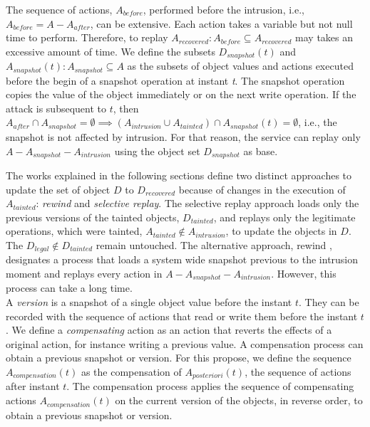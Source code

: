The sequence of actions, $A_{before}$, performed before the intrusion, i.e., $A_{before} = A - A_{after}$, can be extensive. Each action takes a variable but not null time to perform. Therefore, to replay $A_{recovered} : A_{before} \subseteq A_{recovered} $ may takes an excessive amount of time. We define the subsets $D_{snapshot}(t)$ and $A_{snapshot}(t) : A_{snapshot} \subseteq A$ as the subsets of object values and actions executed before the begin of a snapshot operation at instant \textit{t}. The snapshot operation copies the value of the object immediately or on the next write operation. If the attack is subsequent to $t$, then $A_{after} \cap A_{snapshot} = \emptyset \implies (A_{intrusion} \cup A_{tainted}) \cap A_{snapshot}(t) = \emptyset$, i.e., the snapshot is not affected by intrusion. For that reason, the service can replay only $A-A_{snapshot}-A_{intrusion}$ using the object set $D_{snapshot}$ as base. 


The works explained in the following sections define two distinct approaches to update the set of object $D$ to $D_{recovered}$ because of changes in the execution of $A_{tainted}$: \textit{rewind} and \textit{selective replay}. The selective replay approach loads only the previous versions of the tainted objects, $D_{tainted}$, and replays only the legitimate operations, which were tainted, $A_{tainted} \notin A_{intrusion}$, to update the objects in $D$. The $D_{legal} \notin D_{tainted}$ remain untouched. The alternative approach, rewind \cite{Brownc}, designates a process that loads a system wide snapshot previous to the intrusion moment and replays every action in $A-A_{snapshot}-A_{intrusion}$. However, this process can take a long time. \\


 A \textit{version} is a snapshot of a single object value before the instant $t$. They can be recorded with the sequence of actions that read or write them before the instant $t$. We define a \textit{compensating} action as an action that reverts the effects of a original action, for instance writing a previous value. A compensation process can obtain a previous snapshot or version. For this propose, we define the sequence $A_{compensation}(t)$ as the compensation of $A_{posteriori}(t)$, the sequence of actions after instant $t$. The compensation process applies the sequence of compensating actions $A_{compensation}(t)$ on the current version of the objects, in reverse order, to obtain a previous snapshot or version.\\

